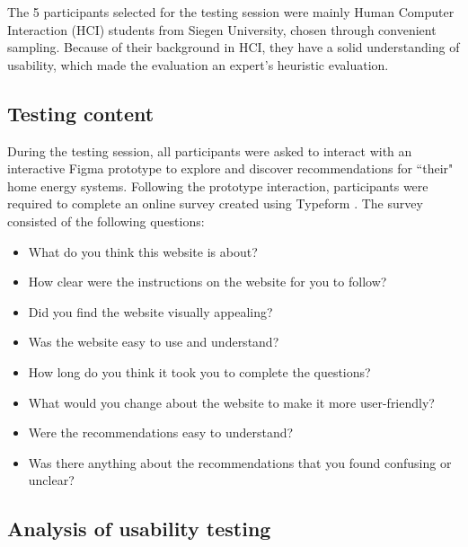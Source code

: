 The 5 participants selected for the testing session were mainly Human Computer Interaction (HCI) students from Siegen University, chosen through convenient sampling. 
Because of their background in HCI, they have a solid understanding of usability, which made the evaluation an expert's heuristic evaluation. 


\subsection{Testing content}

During the testing session, all participants were asked to interact with an interactive Figma prototype to explore and discover recommendations for ``their" home energy systems. 
Following the prototype interaction, participants were required to complete an online survey created using Typeform \cite{typeform}.
The survey consisted of the following questions: 
\begin{itemize}
  \item What do you think this website is about?
  \item How clear were the instructions on the website for you to follow?
  \item Did you find the website visually appealing?
  \item Was the website easy to use and understand?
  \item How long do you think it took you to complete the questions? 
  \item What would you change about the website to make it more user-friendly?
  \item Were the recommendations easy to understand?
  \item Was there anything about the recommendations that you found confusing or unclear?
\end{itemize}


\subsection{Analysis of usability testing}

